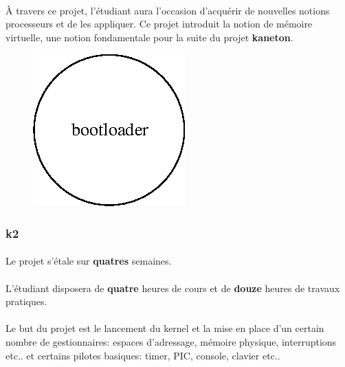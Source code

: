 \documentclass[10pt,a4wide]{article}
\begin{document}
\paragraph{}

\`A travers ce projet, l'\'etudiant aura l'occasion d'acqu\'erir de nouvelles
notions processeurs et de les appliquer. Ce projet introduit la notion
de m\'emoire virtuelle, une notion fondamentale pour la suite du projet
\textbf{kaneton}.

\vspace{5cm}

\begin{figure}[h]
\centerline{\includegraphics{figures/k1.eps}}
\end{figure}

\newpage

\subsubsection{k2}

\paragraph{}

Le projet s'\'etale sur \textbf{quatres} semaines.

\paragraph{}

L'\'etudiant disposera de \textbf{quatre} heures de cours et de \textbf{douze}
heures de travaux pratiques.

\paragraph{}

Le but du projet est le lancement du kernel et la mise en place d'un certain
nombre de gestionnaires: espaces d'adressage, m\'emoire physique,
interruptions etc.. et certains pilotes basiques: timer, PIC, console,
clavier etc..
\end{document}
